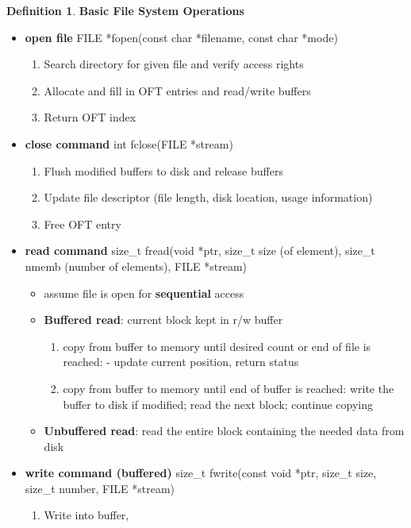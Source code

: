 \documentclass[11pt,a4paper]{article}
\theoremstyle{definition}
\newtheorem{definition}{Definition}[section]
\newenvironment{myitemize}
{ \begin{itemize}
    \setlength{\itemsep}{5pt}
    \setlength{\parskip}{0pt}
    \setlength{\parsep}{0pt}     }
{ \end{itemize}                  }
\newenvironment{myenumerate}
{ \begin{enumerate}
    \setlength{\itemsep}{5pt}
    \setlength{\parskip}{0pt}
    \setlength{\parsep}{0pt}     }
{ \end{enumerate}                }
\begin{document}
\begin{definition}{\textbf{Basic File System Operations}}
	\begin{myitemize}
		\item \textbf{\textsf{open} file} \textsf{FILE *fopen(const char *filename, const char *mode)}
		\begin{myenumerate}
			\item Search directory for given file and verify access rights
			\item Allocate and fill in OFT entries and read/write buffers
			\item Return OFT index
		\end{myenumerate}
		\item \textbf{\textsf{close} command} \textsf{int fclose(FILE *stream)}
		\begin{myenumerate}
			\item Flush modified buffers to disk and release buffers
			\item Update file descriptor (file length, disk location, usage information)
			\item Free OFT entry
		\end{myenumerate}
		\item \textbf{\textsf{read} command} \textsf{size\_t fread(void *ptr, size\_t size (of element), size\_t nmemb (number of elements), FILE *stream)}
		\begin{myitemize}
			\item assume file is open for \textbf{sequential} access
			\item \textbf{Buffered read}: current block kept in r/w buffer
			\begin{myenumerate}
				\item copy from buffer to memory until desired count or end of file is reached: - update current position, return status
				\item copy from buffer to memory until end of buffer is reached: write the buffer to disk if modified; read the next block; continue copying
			\end{myenumerate}
			\item \textbf{Unbuffered read}: read the entire block containing the needed data from disk
		\end{myitemize}
		\item \textbf{\textsf{write} command (buffered)} \textsf{size\_t fwrite(const void *ptr, size\_t size, size\_t number, FILE *stream)}
		\begin{myenumerate}
			\item Write into buffer,

\end{myenumerate}
\end{myitemize}
\end{definition}
\end{document}
